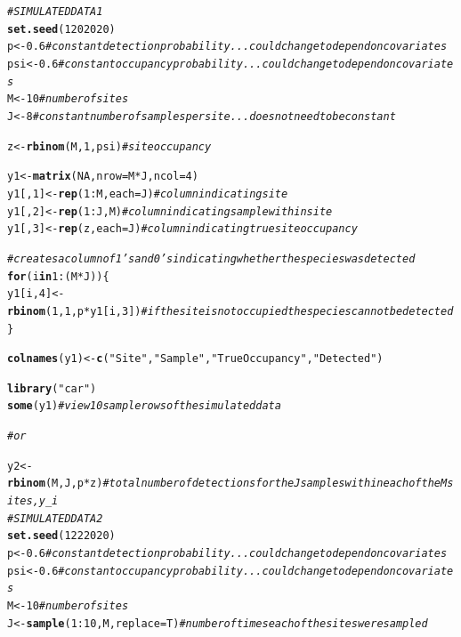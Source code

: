 \documentclass[12pt]{article}\usepackage[]{graphicx}\usepackage[]{color}
\makeatletter
\newcommand{\hlnum}[1]{\textcolor[rgb]{0.686,0.059,0.569}{#1}}%
\newcommand{\hlstr}[1]{\textcolor[rgb]{0.192,0.494,0.8}{#1}}%
\newcommand{\hlcom}[1]{\textcolor[rgb]{0.678,0.584,0.686}{\textit{#1}}}%
\newcommand{\hlopt}[1]{\textcolor[rgb]{0,0,0}{#1}}%
\newcommand{\hlstd}[1]{\textcolor[rgb]{0.345,0.345,0.345}{#1}}%
\newcommand{\hlkwa}[1]{\textcolor[rgb]{0.161,0.373,0.58}{\textbf{#1}}}%
\newcommand{\hlkwb}[1]{\textcolor[rgb]{0.69,0.353,0.396}{#1}}%
\newcommand{\hlkwc}[1]{\textcolor[rgb]{0.333,0.667,0.333}{#1}}%
\newcommand{\hlkwd}[1]{\textcolor[rgb]{0.737,0.353,0.396}{\textbf{#1}}}%
\newenvironment{kframe}{%
 \def\at@end@of@kframe{}%
 \ifinner\ifhmode%
  \def\at@end@of@kframe{\end{minipage}}%
  \begin{minipage}{\columnwidth}%
 \fi\fi%
 \def\FrameCommand##1{\hskip\@totalleftmargin \hskip-\fboxsep
 \colorbox{shadecolor}{##1}\hskip-\fboxsep
     \hskip-\linewidth \hskip-\@totalleftmargin \hskip\columnwidth}%
 \MakeFramed {\advance\hsize-\width
   \@totalleftmargin\z@ \linewidth\hsize
   \@setminipage}}%
 {\par\unskip\endMakeFramed%
 \at@end@of@kframe}
\newenvironment{knitrout}{}{} %
\newcommand{\hlnum}[1]{\textcolor[rgb]{0.686,0.059,0.569}{#1}}%
\newcommand{\hlstr}[1]{\textcolor[rgb]{0.192,0.494,0.8}{#1}}%
\newcommand{\hlcom}[1]{\textcolor[rgb]{0.678,0.584,0.686}{\textit{#1}}}%
\newcommand{\hlopt}[1]{\textcolor[rgb]{0,0,0}{#1}}%
\newcommand{\hlstd}[1]{\textcolor[rgb]{0.345,0.345,0.345}{#1}}%
\newcommand{\hlkwa}[1]{\textcolor[rgb]{0.161,0.373,0.58}{\textbf{#1}}}%
\newcommand{\hlkwb}[1]{\textcolor[rgb]{0.69,0.353,0.396}{#1}}%
\newcommand{\hlkwc}[1]{\textcolor[rgb]{0.333,0.667,0.333}{#1}}%
\newcommand{\hlkwd}[1]{\textcolor[rgb]{0.737,0.353,0.396}{\textbf{#1}}}%
\newenvironment{kframe}{%
 \def\at@end@of@kframe{}%
 \ifinner\ifhmode%
  \def\at@end@of@kframe{\end{minipage}}%
  \begin{minipage}{\columnwidth}%
 \fi\fi%
 \def\FrameCommand##1{\hskip\@totalleftmargin \hskip-\fboxsep
 \colorbox{shadecolor}{##1}\hskip-\fboxsep
     \hskip-\linewidth \hskip-\@totalleftmargin \hskip\columnwidth}%
 \MakeFramed {\advance\hsize-\width
   \@totalleftmargin\z@ \linewidth\hsize
   \@setminipage}}%
 {\par\unskip\endMakeFramed%
 \at@end@of@kframe}
\newenvironment{knitrout}{}{} %
\makeatother
\begin{document}
\begin{knitrout}
\color{fgcolor}\begin{kframe}
\begin{alltt}
\hlcom{# SIMULATED DATA 1}
\hlkwd{set.seed}\hlstd{(}\hlnum{1202020}\hlstd{)}
\hlstd{p} \hlkwb{<-} \hlnum{0.6} \hlcom{# constant detection probability... could change to depend on covariates}
\hlstd{psi} \hlkwb{<-} \hlnum{0.6} \hlcom{# constant occupancy probability... could change to depend on covariates }
\hlstd{M} \hlkwb{<-} \hlnum{10} \hlcom{# number of sites}
\hlstd{J} \hlkwb{<-} \hlnum{8} \hlcom{# constant number of samples per site... does not need to be constant}

\hlstd{z} \hlkwb{<-} \hlkwd{rbinom}\hlstd{(M,} \hlnum{1}\hlstd{, psi)} \hlcom{# site occupancy}

\hlstd{y1} \hlkwb{<-} \hlkwd{matrix}\hlstd{(}\hlnum{NA}\hlstd{,} \hlkwc{nrow} \hlstd{= M}\hlopt{*}\hlstd{J,} \hlkwc{ncol} \hlstd{=} \hlnum{4}\hlstd{)}
\hlstd{y1[,} \hlnum{1}\hlstd{]} \hlkwb{<-} \hlkwd{rep}\hlstd{(}\hlnum{1}\hlopt{:}\hlstd{M,} \hlkwc{each}  \hlstd{= J)} \hlcom{# column indicating site}
\hlstd{y1[,} \hlnum{2}\hlstd{]} \hlkwb{<-} \hlkwd{rep}\hlstd{(}\hlnum{1}\hlopt{:}\hlstd{J, M)} \hlcom{# column indicating sample within site}
\hlstd{y1[,} \hlnum{3}\hlstd{]} \hlkwb{<-} \hlkwd{rep}\hlstd{(z,} \hlkwc{each} \hlstd{= J)} \hlcom{# column indicating true site occupancy}

\hlcom{# creates a column of 1's and 0's indicating whether the species was detected}
\hlkwa{for}\hlstd{(i} \hlkwa{in} \hlnum{1}\hlopt{:}\hlstd{(M}\hlopt{*}\hlstd{J))\{}
    \hlstd{y1[i,} \hlnum{4}\hlstd{]} \hlkwb{<-} \hlkwd{rbinom}\hlstd{(}\hlnum{1}\hlstd{,} \hlnum{1} \hlstd{, p}\hlopt{*}\hlstd{y1[i,} \hlnum{3}\hlstd{])} \hlcom{# if the site is not occupied the species cannot be detected}
\hlstd{\}}

\hlkwd{colnames}\hlstd{(y1)} \hlkwb{<-} \hlkwd{c}\hlstd{(}\hlstr{"Site"}\hlstd{,} \hlstr{"Sample"}\hlstd{,} \hlstr{"True Occupancy"}\hlstd{,} \hlstr{"Detected"}\hlstd{)}

\hlkwd{library}\hlstd{(}\hlstr{"car"}\hlstd{)}
\hlkwd{some}\hlstd{(y1)} \hlcom{# view 10 sample rows of the simulated data}

\hlcom{# or}

\hlstd{y2} \hlkwb{<-} \hlkwd{rbinom}\hlstd{(M, J, p}\hlopt{*}\hlstd{z)} \hlcom{# total number of detections for the J samples within each of the M sites, y_i}
\hlcom{# SIMULATED DATA 2}
\hlkwd{set.seed}\hlstd{(}\hlnum{1222020}\hlstd{)}
\hlstd{p} \hlkwb{<-} \hlnum{0.6} \hlcom{# constant detection probability... could change to depend on covariates}
\hlstd{psi} \hlkwb{<-} \hlnum{0.6} \hlcom{# constant occupancy probability... could change to depend on covariates }
\hlstd{M} \hlkwb{<-} \hlnum{10} \hlcom{# number of sites}
\hlstd{J} \hlkwb{<-} \hlkwd{sample}\hlstd{(}\hlnum{1}\hlopt{:}\hlnum{10}\hlstd{, M,} \hlkwc{replace} \hlstd{= T)} \hlcom{# number of times each of the sites were sampled}


\end{alltt}
\end{kframe}
\end{knitrout}
\end{document}
